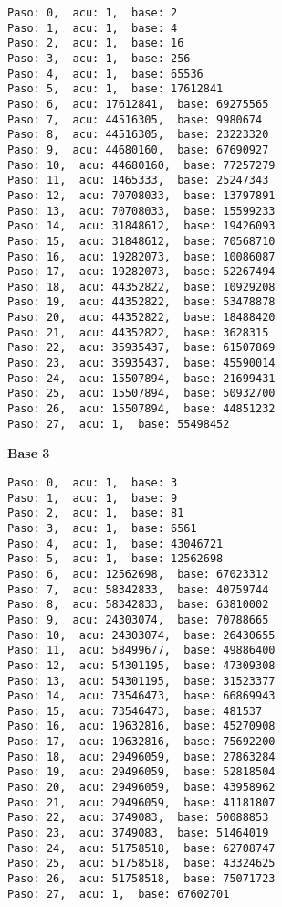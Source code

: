 \documentclass[a4paper]{article}
\begin{document}
\begin{verbatim}
Paso: 0,  acu: 1,  base: 2  
Paso: 1,  acu: 1,  base: 4  
Paso: 2,  acu: 1,  base: 16  
Paso: 3,  acu: 1,  base: 256  
Paso: 4,  acu: 1,  base: 65536  
Paso: 5,  acu: 1,  base: 17612841  
Paso: 6,  acu: 17612841,  base: 69275565  
Paso: 7,  acu: 44516305,  base: 9980674  
Paso: 8,  acu: 44516305,  base: 23223320  
Paso: 9,  acu: 44680160,  base: 67690927  
Paso: 10,  acu: 44680160,  base: 77257279  
Paso: 11,  acu: 1465333,  base: 25247343  
Paso: 12,  acu: 70708033,  base: 13797891  
Paso: 13,  acu: 70708033,  base: 15599233  
Paso: 14,  acu: 31848612,  base: 19426093  
Paso: 15,  acu: 31848612,  base: 70568710  
Paso: 16,  acu: 19282073,  base: 10086087  
Paso: 17,  acu: 19282073,  base: 52267494  
Paso: 18,  acu: 44352822,  base: 10929208  
Paso: 19,  acu: 44352822,  base: 53478878  
Paso: 20,  acu: 44352822,  base: 18488420  
Paso: 21,  acu: 44352822,  base: 3628315  
Paso: 22,  acu: 35935437,  base: 61507869  
Paso: 23,  acu: 35935437,  base: 45590014  
Paso: 24,  acu: 15507894,  base: 21699431  
Paso: 25,  acu: 15507894,  base: 50932700  
Paso: 26,  acu: 15507894,  base: 44851232  
Paso: 27,  acu: 1,  base: 55498452  
\end{verbatim}

\textbf{Base 3}
\begin{verbatim}
Paso: 0,  acu: 1,  base: 3  
Paso: 1,  acu: 1,  base: 9  
Paso: 2,  acu: 1,  base: 81  
Paso: 3,  acu: 1,  base: 6561  
Paso: 4,  acu: 1,  base: 43046721  
Paso: 5,  acu: 1,  base: 12562698  
Paso: 6,  acu: 12562698,  base: 67023312  
Paso: 7,  acu: 58342833,  base: 40759744  
Paso: 8,  acu: 58342833,  base: 63810002  
Paso: 9,  acu: 24303074,  base: 70788665  
Paso: 10,  acu: 24303074,  base: 26430655  
Paso: 11,  acu: 58499677,  base: 49886400  
Paso: 12,  acu: 54301195,  base: 47309308  
Paso: 13,  acu: 54301195,  base: 31523377  
Paso: 14,  acu: 73546473,  base: 66869943  
Paso: 15,  acu: 73546473,  base: 481537  
Paso: 16,  acu: 19632816,  base: 45270908  
Paso: 17,  acu: 19632816,  base: 75692200  
Paso: 18,  acu: 29496059,  base: 27863284  
Paso: 19,  acu: 29496059,  base: 52818504  
Paso: 20,  acu: 29496059,  base: 43958962  
Paso: 21,  acu: 29496059,  base: 41181807  
Paso: 22,  acu: 3749083,  base: 50088853  
Paso: 23,  acu: 3749083,  base: 51464019  
Paso: 24,  acu: 51758518,  base: 62708747  
Paso: 25,  acu: 51758518,  base: 43324625  
Paso: 26,  acu: 51758518,  base: 75071723  
Paso: 27,  acu: 1,  base: 67602701 
\end{verbatim}
\end{document}
